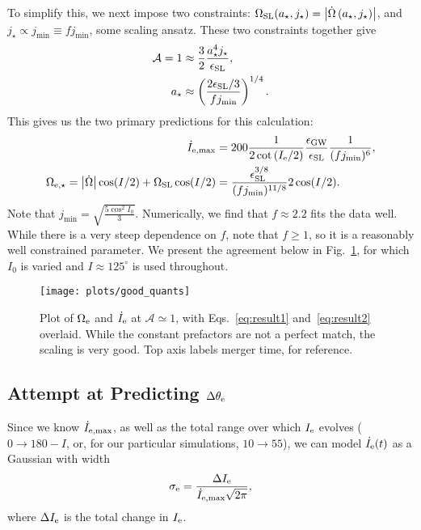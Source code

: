 \documentclass[11pt,
        usenames, %
        dvipsnames %
    ]{article}
\newcommand*{\abs}[1]{\left|#1\right|}
\newcommand*{\p}[1]{\left(#1\right)}
\begin{document}
To simplify this, we next impose two constraints: $\Omega_{\rm SL}(a_\star,
j_\star) = \abs{\dot{\Omega}\p{a_\star, j_\star}}$, and $j_{\star} \propto
j_{\min} \equiv f j_{\min}$, some scaling ansatz. These two constraints together
give
\begin{align}
    \mathcal{A} = 1 &\approx \frac{3}{2}\frac{a_\star^4 j_\star}{
            \epsilon_{\rm SL}},\\
    a_\star &\approx \p{\frac{2\epsilon_{\rm SL}/3}{fj_{\min}}}^{1/4}.
\end{align}
This gives us the two primary predictions for this calculation:
\begin{align}
    \dot{I}_{\rm e, \max} &= 200\frac{1}{2\cot \p{I_{\rm e} / 2}}
        \frac{\epsilon_{\rm GW}}{\epsilon_{\rm SL}}
        \frac{1}{(f j_{\min})^6}\label{eq:result1},\\
    \Omega_{\rm e,\star} = \abs{\dot{\Omega}} \cos (I/2)
        + \Omega_{\rm SL}\cos (I/2)
        &= \frac{\epsilon_{\rm SL}^{3/8}}{(f j_{\min})^{11/8}}
            2\cos (I/2).\label{eq:result2}
\end{align}
Note that $j_{\min} = \sqrt{\frac{5 \cos^2 I_0}{3}}$. Numerically, we find that
$f \approx 2.2$ fits the data well. While there is a very steep dependence on
$f$, note that $f \geq 1$, so it is a reasonably well constrained parameter. We
present the agreement below in Fig.~\ref{fig:good_quants}, for which $I_0$ is
varied and $I \approx 125^\circ$ is used throughout.
\begin{figure}
    \centering
    \texttt{[image: plots/good\_quants]}
    \caption{Plot of $\Omega_{\rm e}$ and $\dot{I}_{\rm e}$ at $\mathcal{A}
    \simeq 1$, with Eqs.~\eqref{eq:result1} and~\eqref{eq:result2} overlaid.
    While the constant prefactors are not a perfect match, the scaling is very
    good. Top axis labels merger time, for reference.}\label{fig:good_quants}
\end{figure}

\subsection{Attempt at Predicting $\Delta \theta_{\rm e}$}

Since we know $\dot{I}_{\rm e, \max}$, as well as the total range over which
$I_{\rm e}$ evolves ($0 \to 180 - I$, or, for our particular simulations, $10
\to 55$), we can model $\dot{I}_{\rm e}(t)$ as a Gaussian with width
\begin{equation}
    \sigma_{\rm e} = \frac{\Delta I_{\rm e}}{\dot{I}_{\rm e, \max} \sqrt{2\pi}},
\end{equation}
where $\Delta I_{\rm e}$ is the total change in $I_{\rm e}$.
\end{document}
